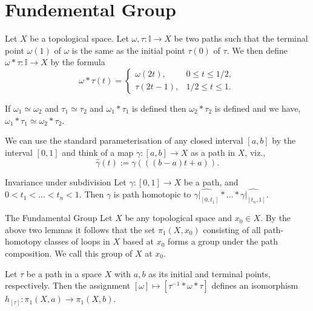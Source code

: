 \documentclass[../main.tex]{subfiles}
\begin{document}
\chapter{ Fundemental Group }

\begin{definition}{}{}
Let $X$ be a topological space. Let $\omega, \tau: \mathbb{I} \longrightarrow X$ be two paths such that the terminal point $\omega(1)$ of $\omega$ is the same as the initial point $\tau(0)$ of $\tau$. We then define $\omega * \tau: \mathbb{I} \longrightarrow X$ by the formula
\begin{equation}
\omega * \tau(t)=\left\{\begin{array}{ll}
\omega(2 t), & 0 \leq t \leq 1 / 2, \\
\tau(2 t-1), & 1 / 2 \leq t \leq 1 .
\end{array}\right.
\end{equation}
\end{definition}
\begin{lemma}{}{}
If $\omega_{1} \simeq \omega_{2}$ and $\tau_{1} \simeq \tau_{2}$ and $\omega_{1} * \tau_{1}$ is defined then $\omega_{2} * \tau_{2}$ is defined and we have, $\omega_{1} * \tau_{1} \simeq \omega_{2} * \tau_{2}$.
\end{lemma}

\begin{definition}{}{}
    We can use the standard parameterisation of any closed interval $[a, b]$ by the interval $[0, 1]$ and think of a map $\gamma : [a, b] \to X$ as a path in $X$, viz.,
\[
\hat{\gamma}(t) := \gamma(((b - a)t + a)).
\]
\end{definition}

\begin{theorem}{Invariance under subdivision}{}
Let $\gamma : [0,1] \to X$ be a path, and $0 < t_1 < \dots < t_n < 1$. Then $\gamma$ is path homotopic to $\widehat{\gamma|_{[0,t_1]}} * \dots * \widehat{\gamma|_{[t_n,1]}}$.
\end{theorem}

\begin{definition}{The Fundamental Group}{}
Let $X$ be any topological space and $x_0 \in X$. By the above two lemmas it follows that the set $\pi_1(X, x_0)$ consisting of all path-homotopy classes of loops in $X$ based at $x_0$ forms a group under the path composition. We call this group  of $X$ at $x_0$.
\end{definition}

\begin{theorem}{}{}
Let $\tau$ be a path in a space $X$ with $a,b$ as its initial and terminal points, respectively. Then the assignment $[\omega] \mapsto [\tau^{-1} * \omega * \tau]$ defines an isomorphism $h_{[\tau]}: \pi_1(X, a) \rightarrow \pi_1(X,b)$.
\end{theorem}
\end{document}
